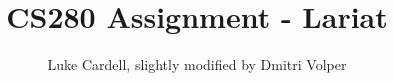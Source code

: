 \documentclass{exam}
\title{CS280 Assignment - Lariat}
\date{ }
\author{Luke Cardell, slightly modified by Dmitri Volper}
\begin{document}
\maketitle


\pagebreak
\tableofcontents
\pagebreak




\end{document}
